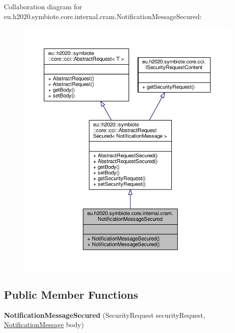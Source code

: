 Collaboration diagram for eu.\+h2020.\+symbiote.\+core.\+internal.\+cram.\+Notification\+Message\+Secured\+:\nopagebreak
\begin{figure}[H]
\begin{center}
\leavevmode
\includegraphics[width=350pt]{classeu_1_1h2020_1_1symbiote_1_1core_1_1internal_1_1cram_1_1NotificationMessageSecured__coll__graph}
\end{center}
\end{figure}
\subsection*{Public Member Functions}
\begin{DoxyCompactItemize}
\item 
\mbox{\label{classeu_1_1h2020_1_1symbiote_1_1core_1_1internal_1_1cram_1_1NotificationMessageSecured_a04fbd9ee63ec48671437c0d962c7e2ec}} 
{\bfseries Notification\+Message\+Secured} (Security\+Request security\+Request, \hyperlink{classeu_1_1h2020_1_1symbiote_1_1core_1_1cci_1_1accessNotificationMessages_1_1NotificationMessage}{Notification\+Message} body)
\end{DoxyCompactItemize}


